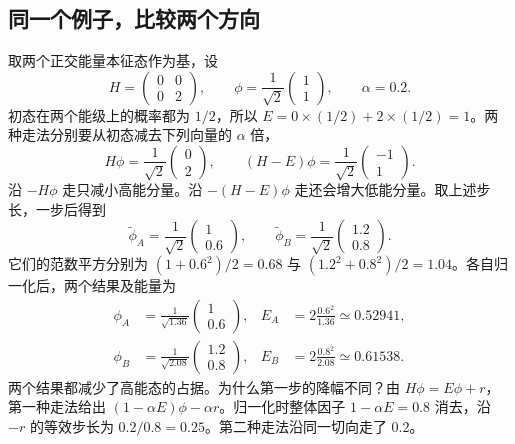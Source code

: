 \subsection{同一个例子，比较两个方向}
取两个正交能量本征态作为基，设
\begin{equation}
H=\begin{pmatrix}0&0\\0&2\end{pmatrix},\qquad
\phi=\frac1{\sqrt2}\begin{pmatrix}1\\1\end{pmatrix},\qquad \alpha=0.2.
\end{equation}
初态在两个能级上的概率都为 $1/2$，所以 $E=0\times(1/2)+2\times(1/2)=1$。两种走法分别要从初态减去下列向量的 $\alpha$ 倍，
\begin{equation}
H\phi=\frac1{\sqrt2}\begin{pmatrix}0\\2\end{pmatrix},\qquad
(H-E)\phi=\frac1{\sqrt2}\begin{pmatrix}-1\\1\end{pmatrix}.
\end{equation}
沿 $-H\phi$ 走只减小高能分量。沿 $-(H-E)\phi$ 走还会增大低能分量。取上述步长，一步后得到
\begin{equation}
\widetilde\phi_A=\frac1{\sqrt2}\begin{pmatrix}1\\0.6\end{pmatrix},
\qquad
\widetilde\phi_B=\frac1{\sqrt2}\begin{pmatrix}1.2\\0.8\end{pmatrix}.
\end{equation}
它们的范数平方分别为 $(1+0.6^2)/2=0.68$ 与 $(1.2^2+0.8^2)/2=1.04$。各自归一化后，两个结果及能量为
\begin{align}
\phi_A&=\frac1{\sqrt{1.36}}\begin{pmatrix}1\\0.6\end{pmatrix},
& E_A&=2\frac{0.6^2}{1.36}\simeq0.52941,\\
\phi_B&=\frac1{\sqrt{2.08}}\begin{pmatrix}1.2\\0.8\end{pmatrix},
& E_B&=2\frac{0.8^2}{2.08}\simeq0.61538.
\end{align}
两个结果都减少了高能态的占据。为什么第一步的降幅不同？由 $H\phi=E\phi+r$，第一种走法给出 $(1-\alpha E)\phi-\alpha r$。归一化时整体因子 $1-\alpha E=0.8$ 消去，沿 $-r$ 的等效步长为 $0.2/0.8=0.25$。第二种走法沿同一切向走了 $0.2$。

